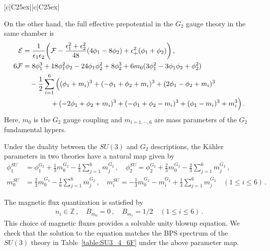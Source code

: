 \begin{table}
\begin{tabular}{|c|C{25ex}||c|C{25ex}|}
	\end{tabular}
	\caption{BPS spectrum of the $ SU(3)_4 + 6\mathbf{F} $ theory for $ (d_1 = 1, d_2 \leq 1, d_3 \leq 2) $ and $ (d_1 = 2, d_2 \leq 0, d_3 \leq 1) $ where $ \mathbf{d} = (d_1, d_2, d_3) $ labels the BPS states with charge $ d_1 m_0 + d_2 \alpha_1 + d_3 \alpha_2 $ for simple roots $ \alpha_1 = 2\phi_1 - \phi_2 $, $ \alpha_2 = -\phi_1 + 2\phi_2 $ of $ \mathfrak{su}(3) $ algebra, and 6 flavor charges are blindly summed over.} \label{table:SU3_4_6F}
\end{table}

On the other hand, the full effective prepotential in the $ G_2 $ gauge theory in the same chamber is
\begin{align}
\mathcal{E}
&= \frac{1}{\epsilon_1 \epsilon_2} \qty(\mathcal{F} - \frac{\epsilon_1^2 + \epsilon_2^2}{48} (4\phi_1 - 8\phi_2) + \epsilon_+^2 (\phi_1 + \phi_2) ) \, , \nonumber \\
6\mathcal{F}
&= 8\phi_1^3 + 18\phi_1^2 \phi_2 - 24\phi_1 \phi_2^2 + 8\phi_2^3 + 6m_0(3\phi_1^2 - 3\phi_1 \phi_2 + \phi_2^2) \nonumber \\
& \quad - \frac{1}{2} \sum_{i=1}^6 \Big( (\phi_1 + m_i)^3 + (-\phi_1 + \phi_2 + m_i)^3 + (2\phi_1 - \phi_2 + m_i)^3 \nonumber \\
& \qquad \qquad + (-2\phi_1 + \phi_2 + m_i)^3 + (-\phi_1 + \phi_2 - m_i)^3 + (\phi_1 - m_i)^3 + m_i^3 \Big) \, .
\end{align}
Here, $ m_0 $ is the $ G_2 $ gauge coupling and $ m_{i=1, \cdots, 6} $ are mass parameters of the $G_2$ fundamental hypers.

Under the duality between the $SU(3)$ and $G_2$ descriptions, the K\"ahler parameters in two theories have a natural map \cite{Hayashi:2018lyv} given by 
\begin{align}
\phi_1^{SU} &= \phi_1^{G_2} + \frac{1}{3} m_0^{G_2} - \frac{1}{3} \sum_{j=1}^6 m_j^{G_2}  \,, \quad \phi_2^{SU} = \phi_2^{G_2} + \frac{2}{3} m_0^{G_2} - \frac{2}{3} \sum_{j=1}^6 m_j^{G_2}\ ,  \\
m_0^{SU} &= \frac{2}{3} m_0^{G_2} - \frac{1}{6} \sum_{j=1}^6 m_j^{G_2} \,, \quad
m_i^{SU} = -\frac{1}{3} m_0^{G_2} - m_i^{G_2} + \frac{1}{3} \sum_{j=1}^6 m_j^{G_2} \quad (1 \leq i \leq 6) \, . \nonumber
\end{align}

The magnetic flux quantization is satisfied by
\begin{align}
n_i \in \mathbb{Z}\,, \quad
B_{m_0} = 0\,, \quad
B_{m_i} = 1/2 \quad (1 \leq i \leq 6) \, .
\end{align}
This choice of magnetic fluxes provides a solvable unity blowup equation. We check that the solution to the equation matches the BPS spectrum of the $SU(3)$ theory in Table~\ref{table:SU3_4_6F} under the above parameter map.


